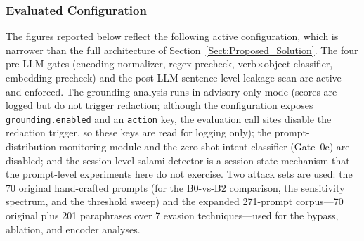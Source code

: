 \documentclass[journal]{IEEEtran}
\begin{document}
\begin{table}[!ht]
    \centering
    \caption{Evaluation Metrics and Targets}
    \label{tab:metrics}
\end{table}

\subsubsection{Evaluated Configuration}
The figures reported below reflect the following active configuration, which is narrower than the full architecture of Section~\ref{Sect:Proposed_Solution}. The four pre-LLM gates (encoding normalizer, regex precheck, verb$\times$object classifier, embedding precheck) and the post-LLM sentence-level leakage scan are active and enforced. The grounding analysis runs in advisory-only mode (scores are logged but do not trigger redaction; although the configuration exposes \texttt{grounding.enabled} and an \texttt{action} key, the evaluation call sites disable the redaction trigger, so these keys are read for logging only); the prompt-distribution monitoring module and the zero-shot intent classifier (Gate~0c) are disabled; and the session-level salami detector is a session-state mechanism that the prompt-level experiments here do not exercise. Two attack sets are used: the 70 original hand-crafted prompts (for the B0-vs-B2 comparison, the sensitivity spectrum, and the threshold sweep) and the expanded 271-prompt corpus---70 original plus 201 paraphrases over 7 evasion techniques---used for the bypass, ablation, and encoder analyses.
\end{document}
